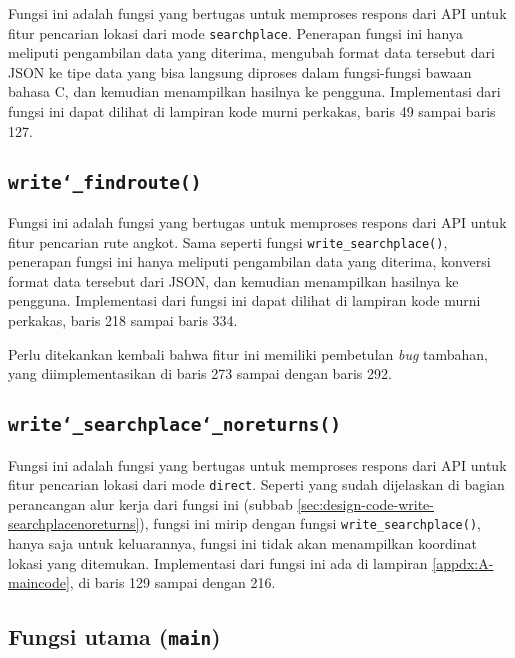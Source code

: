 Fungsi ini adalah fungsi yang bertugas untuk memproses respons dari API untuk fitur pencarian lokasi dari mode \verb|searchplace|. Penerapan fungsi ini hanya meliputi pengambilan data yang diterima, mengubah format data tersebut dari JSON ke tipe data yang bisa langsung diproses dalam fungsi-fungsi bawaan bahasa C, dan kemudian menampilkan hasilnya ke pengguna. Implementasi dari fungsi ini dapat dilihat di lampiran kode murni perkakas, baris 49 sampai baris 127.
	
\subsection{\texttt{write\char`_findroute()}}
\label{sec:testing-implementation-write-findroute}

Fungsi ini adalah fungsi yang bertugas untuk memproses respons dari API untuk fitur pencarian rute angkot. Sama seperti fungsi \verb|write_searchplace()|, penerapan fungsi ini hanya meliputi pengambilan data yang diterima, konversi format data tersebut dari JSON, dan kemudian menampilkan hasilnya ke pengguna. Implementasi dari fungsi ini dapat dilihat di lampiran kode murni perkakas, baris 218 sampai baris 334.

Perlu ditekankan kembali bahwa fitur ini memiliki pembetulan \textit{bug} tambahan, yang diimplementasikan di baris 273 sampai dengan baris 292.

\subsection{\texttt{write\char`_searchplace\char`_noreturns()}}
\label{sec:testing-implementation-write-searchplacenoreturns}

Fungsi ini adalah fungsi yang bertugas untuk memproses respons dari API untuk fitur pencarian lokasi dari mode \verb|direct|. Seperti yang sudah dijelaskan di bagian perancangan alur kerja dari fungsi ini (subbab \ref{sec:design-code-write-searchplacenoreturns}), fungsi ini mirip dengan fungsi \verb|write_searchplace()|, hanya saja untuk keluarannya, fungsi ini tidak akan menampilkan koordinat lokasi yang ditemukan. Implementasi dari  fungsi ini ada di lampiran \ref{appdx:A-maincode}, di baris 129 sampai dengan 216.

\subsection{Fungsi utama (\texttt{main})}
\label{sec:testing-implementation-main}

